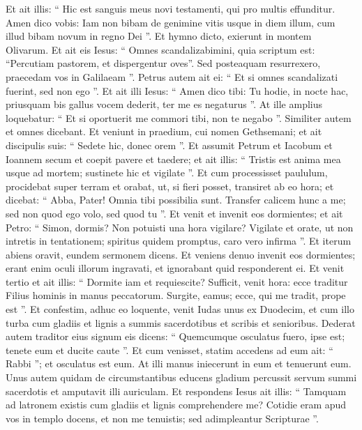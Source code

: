 \begin{biblechapter}
\begin{biblechapter}
\begin{biblechapter}
\begin{biblechapter}
\begin{biblechapter}
\begin{biblechapter}
\begin{biblechapter}
\begin{biblechapter}
\begin{biblechapter}
\begin{biblechapter}
\begin{biblechapter}
\begin{biblechapter}
\begin{biblechapter}
\begin{biblechapter}
\verse Et ait illis: “ Hic est sanguis meus novi testamenti, qui pro multis effunditur. 
\verse Amen dico vobis: Iam non bibam de genimine vitis usque in diem illum, cum illud bibam novum in regno Dei ”.
 \verse Et hymno dicto, exierunt in montem Olivarum. 
\verse Et ait eis Iesus: “ Omnes scandalizabimini, quia scriptum est: “Percutiam pastorem, et dispergentur oves”.
 \verse Sed posteaquam resurrexero, praecedam vos in Galilaeam ”. 
\verse Petrus autem ait ei: “ Et si omnes scandalizati fuerint, sed non ego ”. 
\verse Et ait illi Iesus: “ Amen dico tibi: Tu hodie, in nocte hac, priusquam bis gallus vocem dederit, ter me es negaturus ”. 
\verse At ille amplius loquebatur: “ Et si oportuerit me commori tibi, non te negabo ”. Similiter autem et omnes dicebant.
 \verse Et veniunt in praedium, cui nomen Gethsemani; et ait discipulis suis: “ Sedete hic, donec orem ”. 
\verse Et assumit Petrum et Iacobum et Ioannem secum et coepit pavere et taedere; 
\verse et ait illis: “ Tristis est anima mea usque ad mortem; sustinete hic et vigilate ”. 
\verse Et cum processisset paululum, procidebat super terram et orabat, ut, si fieri posset, transiret ab eo hora; 
 \verse et dicebat: “ Abba, Pater! Omnia tibi possibilia sunt. Transfer calicem hunc a me; sed non quod ego volo, sed quod tu ”. 
\verse Et venit et invenit eos dormientes; et ait Petro: “ Simon, dormis? Non potuisti una hora vigilare? 
 \verse Vigilate et orate, ut non intretis in tentationem; spiritus quidem promptus, caro vero infirma ”. 
\verse Et iterum abiens oravit, eundem sermonem dicens. 
 \verse Et veniens denuo invenit eos dormientes; erant enim oculi illorum ingravati, et ignorabant quid responderent ei. 
\verse Et venit tertio et ait illis: “ Dormite iam et requiescite? Sufficit, venit hora: ecce traditur Filius hominis in manus peccatorum. 
\verse Surgite, eamus; ecce, qui me tradit, prope est ”.
 \verse Et confestim, adhuc eo loquente, venit Iudas unus ex Duodecim, et cum illo turba cum gladiis et lignis a summis sacerdotibus et scribis et senioribus. 
 \verse Dederat autem traditor eius signum eis dicens: “ Quemcumque osculatus fuero, ipse est; tenete eum et ducite caute ”. 
\verse Et cum venisset, statim accedens ad eum ait: “ Rabbi ”; et osculatus est eum. 
\verse At illi manus iniecerunt in eum et tenuerunt eum. 
\verse Unus autem quidam de circumstantibus educens gladium percussit servum summi sacerdotis et amputavit illi auriculam. 
\verse Et respondens Iesus ait illis: “ Tamquam ad latronem existis cum gladiis et lignis comprehendere me? 
\verse Cotidie eram apud vos in templo docens, et non me tenuistis; sed adimpleantur Scripturae ”.

\end{biblechapter}
\end{biblechapter}
\end{biblechapter}
\end{biblechapter}
\end{biblechapter}
\end{biblechapter}
\end{biblechapter}
\end{biblechapter}
\end{biblechapter}
\end{biblechapter}
\end{biblechapter}
\end{biblechapter}
\end{biblechapter}
\end{biblechapter}
